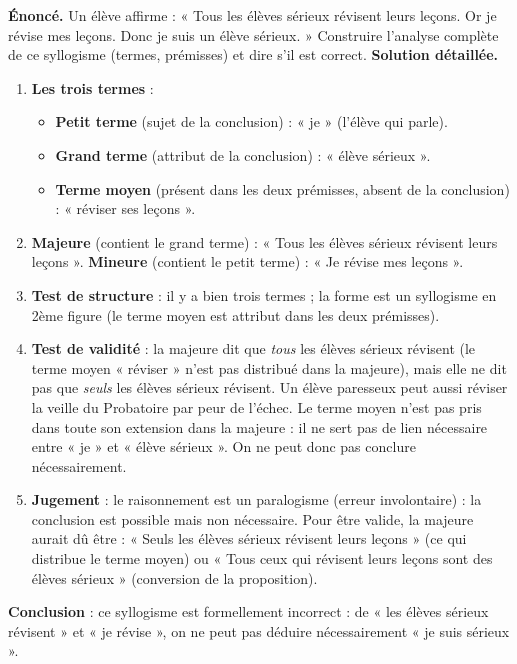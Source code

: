 \documentclass[11pt]{article}
\newcommand{\cle}[1]{{\popxbold\color{popdark}#1}}
\begin{document}
\begin{exoresolu}
\textbf{Énoncé.} Un élève affirme : « Tous les élèves sérieux révisent leurs leçons. Or je révise mes leçons. Donc je suis un élève sérieux. » Construire l'analyse complète de ce syllogisme (termes, prémisses) et dire s'il est correct.
\tcblower
\textbf{Solution détaillée.}
\begin{enumerate}
\item \textbf{Les trois termes} :
\begin{itemize}
\item \textbf{Petit terme} (sujet de la conclusion) : « je » (l'élève qui parle).
\item \textbf{Grand terme} (attribut de la conclusion) : « élève sérieux ».
\item \textbf{Terme moyen} (présent dans les deux prémisses, absent de la conclusion) : « réviser ses leçons ».
\end{itemize}
\item \textbf{Majeure} (contient le grand terme) : « Tous les élèves sérieux révisent leurs leçons ». \textbf{Mineure} (contient le petit terme) : « Je révise mes leçons ».
\item \textbf{Test de structure} : il y a bien trois termes ; la forme est un syllogisme en 2ème figure (le terme moyen est attribut dans les deux prémisses).
\item \textbf{Test de validité} : la majeure dit que \emph{tous} les élèves sérieux révisent (le terme moyen « réviser » n'est pas distribué dans la majeure), mais elle ne dit pas que \emph{seuls} les élèves sérieux révisent. Un élève paresseux peut aussi réviser la veille du Probatoire par peur de l'échec. Le terme moyen n'est pas pris dans toute son extension dans la majeure : il ne sert pas de lien nécessaire entre « je » et « élève sérieux ». On ne peut donc pas conclure nécessairement.
\item \textbf{Jugement} : le raisonnement est un \cle{paralogisme} (erreur involontaire) : la conclusion est possible mais non nécessaire. Pour être valide, la majeure aurait dû être : « Seuls les élèves sérieux révisent leurs leçons » (ce qui distribue le terme moyen) ou « Tous ceux qui révisent leurs leçons sont des élèves sérieux » (conversion de la proposition).
\end{enumerate}
\textbf{Conclusion} : ce syllogisme est formellement incorrect : de « les élèves sérieux révisent » et « je révise », on ne peut pas déduire nécessairement « je suis sérieux ».
\end{exoresolu}
\end{document}
